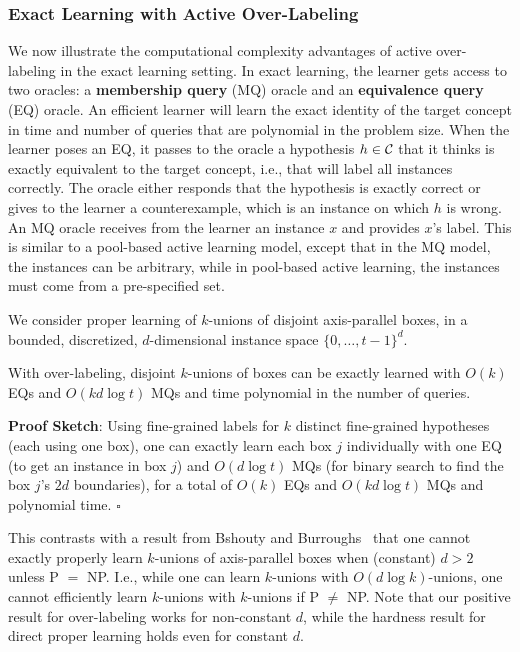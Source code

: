 \subsubsection{Exact Learning with Active Over-Labeling}
We now illustrate the computational complexity advantages of
active over-labeling in the exact learning setting.  In 
exact learning, the learner gets access to two oracles: a
{\bf membership query} (MQ) oracle and an {\bf equivalence query}
(EQ) oracle.  An efficient learner will learn the exact identity
of the target concept in time and number of queries that are
polynomial in the problem size.  When the learner poses an EQ, it
passes to the oracle a hypothesis $h \in {\cal C}$ that it thinks is exactly
equivalent to the target concept, i.e., that will label all instances
correctly.  The oracle either responds that the hypothesis
is exactly correct or gives to the learner a counterexample, which
is an instance on which $h$ is wrong.  An MQ oracle receives from
the learner an instance $x$ and provides $x$'s label.  This is similar
to a pool-based active learning model, except that in the MQ model, the
instances can be arbitrary, while in pool-based active learning,
the instances must come from a pre-specified set.

We consider
proper learning of $k$-unions of disjoint axis-parallel boxes,
in a bounded, discretized, $d$-dimensional instance space $\{0,\ldots,t-1\}^d$.

\begin{obs}
With over-labeling, disjoint $k$-unions of boxes 
can be exactly learned with
$O(k)$ EQs and $O(kd \log t)$ MQs and time polynomial in the number of queries.
\end{obs}
{\bf Proof Sketch}:
Using fine-grained labels for $k$ distinct fine-grained hypotheses (each using one 
box), one can exactly learn each box $j$ individually with one EQ (to get an
instance in box $j$)
and $O(d \log t)$ MQs (for binary search to find the box $j$'s $2d$
boundaries), for a
total of $O(k)$ EQs and $O(kd \log t)$ MQs and polynomial time.
 \hfill $\square$

This contrasts with a result from Bshouty and Burroughs~\cite{bb-plapc-03}
that one cannot exactly properly learn $k$-unions of axis-parallel boxes
when (constant) $d>2$ unless P $=$ NP.  I.e., while one 
can learn $k$-unions with $O(d \log k)$-unions, one cannot 
efficiently learn $k$-unions with $k$-unions  if P $\ne$ NP.  
%
Note that our positive result for over-labeling works for non-constant $d$, while the
hardness result for direct proper learning holds even for constant $d$. 

